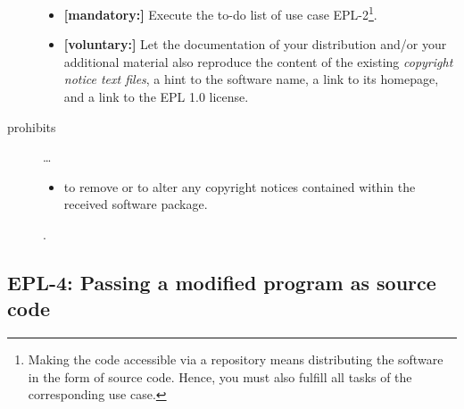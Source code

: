 \begin{description}
\begin{itemize}
  \item \textbf{[mandatory:]} Execute the to-do list of use case EPL-2\footnote{
  Making the code accessible via a repository means distributing the software in
  the form of source code. Hence, you must also fulfill all tasks of the
  corresponding use case.}.
  
  \item \textbf{[voluntary:]} Let the documentation of your distribution and/or
  your additional material also reproduce the content of the existing
  \emph{copyright notice text files}, a hint to the software name, a link to its
  homepage, and a link to the EPL 1.0 license.
    
\end{itemize}

\item[prohibits] \ldots
\begin{itemize}
  \item to remove or to alter any copyright notices contained within the
  received software package.
\end{itemize}.

\end{description}

\subsection{EPL-4: Passing a modified program as source code}
\label{OSUC-04-EPL} 

